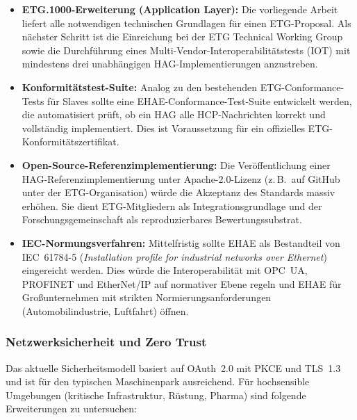 ﻿\documentclass[12pt,a4paper]{article}
\begin{document}
\begin{itemize}[leftmargin=2em]
  \item \textbf{ETG.1000-Erweiterung (Application Layer):} Die vorliegende
    Arbeit liefert alle notwendigen technischen Grundlagen für einen
    ETG-Proposal. Als nächster Schritt ist die Einreichung bei der ETG
    Technical Working Group sowie die Durchführung eines
    Multi-Vendor-Interoperabilitätstests (IOT) mit mindestens drei
    unabhängigen HAG-Implementierungen anzustreben.
  \item \textbf{Konformitätstest-Suite:} Analog zu den bestehenden
    ETG-Conformance-Tests für Slaves sollte eine EHAE-Conformance-Test-Suite
    entwickelt werden, die automatisiert prüft, ob ein HAG alle HCP-Nachrichten
    korrekt und vollständig implementiert. Dies ist Voraussetzung für ein
    offizielles ETG-Konformitätszertifikat.
  \item \textbf{Open-Source-Referenzimplementierung:} Die Veröffentlichung
    einer HAG-Refe\-renzimplementierung unter Apache-2.0-Lizenz (z.\,B.\ auf
    GitHub unter der ETG-Organisation) würde die Akzeptanz des Standards
    massiv erhöhen. Sie dient ETG-Mitgliedern als Integrationsgrundlage und
    der Forschungsgemeinschaft als reproduzierbares Bewertungssubstrat.
  \item \textbf{IEC-Normungsverfahren:} Mittelfristig sollte EHAE als
    Bestandteil von IEC~61784-5 (\emph{Installation profile for industrial
    networks over Ethernet}) eingereicht werden. Dies würde die
    Interoperabilität mit OPC~UA, PROFINET und EtherNet/IP auf normativer
    Ebene regeln und EHAE für Großunternehmen mit strikten
    Normierungsanforderungen (Automobilindustrie, Luftfahrt) öffnen.
\end{itemize}

\subsubsection*{Netzwerksicherheit und Zero Trust}

Das aktuelle Sicherheitsmodell basiert auf OAuth~2.0 mit PKCE und TLS~1.3 und
ist für den typischen Maschinenpark ausreichend. Für hochsensible Umgebungen
(kritische Infrastruktur, Rüstung, Pharma) sind folgende Erweiterungen zu
untersuchen:
\end{document}
